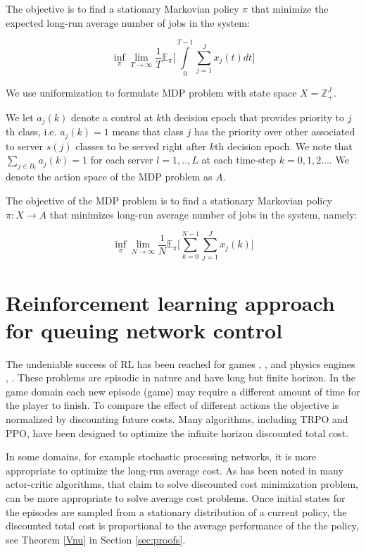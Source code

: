 \documentclass[11pt]{article}
\newcommand{\E}{\mathbb{E}}
\theoremstyle{definition}
\numberwithin{equation}{section}
\begin{document}
 The objective is to find a stationary Markovian policy  $\pi$ that   minimize the expected long-run average number of jobs in the system:

\begin{equation}
 \inf\limits_\pi \lim\limits_{T\rightarrow \infty} \frac{1}{T} \E_{\pi}\Big[\int\limits_{0}^{T-1}\sum\limits_{j=1}^J x_j(t)dt\Big]
\end{equation}


We use uniformization to formulate MDP problem with state space $X = \mathbb{Z}_+^J$.

We let $a_j(k)$  denote a control at $k$th decision epoch that provides priority to $j$th class, i.e. $a_j(k)=1$ means that class $j$ has the priority over other associated to server $s(j)$ classes to be served right after $k$th decision epoch. We note that $\sum\limits_{j \in B_l} a_j(k)=1$ for each server $l=1, .., L$ at each time-step $k=0, 1, 2....$  We denote the action space of the MDP problem as $A$.


The objective of the MDP problem  is to find a stationary Markovian policy $\pi:X\rightarrow A$ that minimizes long-run average number of jobs in the system, namely:

\begin{equation}
 \inf\limits_\pi \lim\limits_{N\rightarrow \infty} \frac{1}{N} \E_{\pi}\Big[\sum\limits_{k=0}^{N-1}\sum\limits_{j=1}^J x_j(k)\Big]
\end{equation}





\section{Reinforcement learning approach for queuing network control}

The undeniable success of RL has been reached for games \cite{Mnih2015}, \cite{Bellemare2013}, and physics engines \cite{Duan2016},  \cite{Todorov2012}. These problems are episodic in nature and have long but finite horizon. In the game domain each new episode (game) may require a different amount of time for the player to finish. To compare the effect of different actions  the objective is
normalized by discounting future costs.
  Many algorithms, including TRPO and PPO, have been designed to optimize the infinite horizon discounted total cost.

In some domains, for example stochastic processing networks, it is more appropriate to optimize the long-run average cost.
As has been noted in \cite{Thomas} many actor-critic algorithms, that claim to solve discounted cost minimization problem,  can be more  appropriate to solve average cost problems. Once initial states for the episodes are sampled from a stationary distribution of a current policy, the discounted total cost is proportional to the average performance of the the policy, see Theorem \ref{Vnu} in Section \ref{sec:proofs}.
\end{document}
